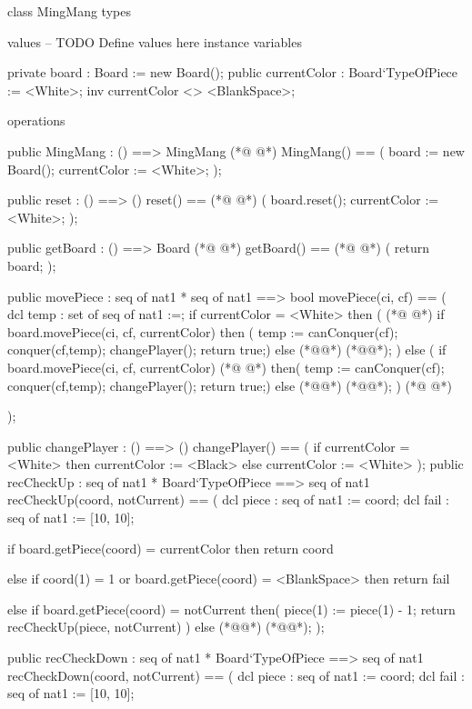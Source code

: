 \begin{vdmpp}[breaklines=true]
class MingMang
types


values
-- TODO Define values here
instance variables

 private board : Board := new Board();
 public currentColor : Board`TypeOfPiece := <White>;
 inv currentColor <> <BlankSpace>;

operations

 public MingMang : () ==> MingMang
(*@
\label{MingMang:16}
@*)
 MingMang() ==
 (
  board := new Board();
  currentColor := <White>;
 );
 
 public reset : () ==> ()
 reset() ==
(*@
\label{reset:24}
@*)
 (
  board.reset();
  currentColor := <White>;
 );
 
 public getBoard : () ==> Board
(*@
\label{getBoard:30}
@*)
 getBoard() ==
(*@
\label{movePiece:31}
@*)
 (
  return board;
 );
 
 
 public movePiece : seq of nat1 * seq of nat1 ==> bool
 movePiece(ci, cf) ==
 ( 
   dcl temp : set of seq of nat1 :={}; 
  if currentColor = <White>
  then 
  (
(*@
\label{createDestC:43}
@*)
     if board.movePiece(ci, cf, currentColor) 
     then 
     (
     temp := canConquer(cf);
     conquer(cf,temp);
     changePlayer();
     return true;)
     else (*@@*) (*@@*);
    )  
  else (
    if board.movePiece(ci, cf, currentColor)
(*@
\label{canConquer:54}
@*)
    then(
     temp := canConquer(cf);
    conquer(cf,temp);
    changePlayer();
    return true;)
    else (*@@*) (*@@*);
     )
(*@
\label{changePlayer:61}
@*)

 );
 
 public changePlayer : () ==> ()
 changePlayer() ==
 (
  if currentColor = <White>
   then currentColor := <Black>
   else currentColor := <White>
 );
 public recCheckUp : seq of nat1 * Board`TypeOfPiece ==> seq of nat1
 recCheckUp(coord, notCurrent) ==
 ( 
  dcl piece : seq of nat1 := coord;
  dcl fail : seq of nat1 := [10, 10];
   
  if board.getPiece(coord) = currentColor
  then return coord
    
  else if coord(1) = 1 or board.getPiece(coord) = <BlankSpace>
  then return fail
  
  else if board.getPiece(coord) = notCurrent
  then(
   piece(1) := piece(1) - 1;
   return recCheckUp(piece, notCurrent)
  ) 
  else (*@@*) (*@@*);
 );
 
 public recCheckDown : seq of nat1 * Board`TypeOfPiece ==> seq of nat1
 recCheckDown(coord, notCurrent) ==
 ( 
  dcl piece : seq of nat1 := coord;
  dcl fail : seq of nat1 := [10, 10];
   

\end{vdmpp}
